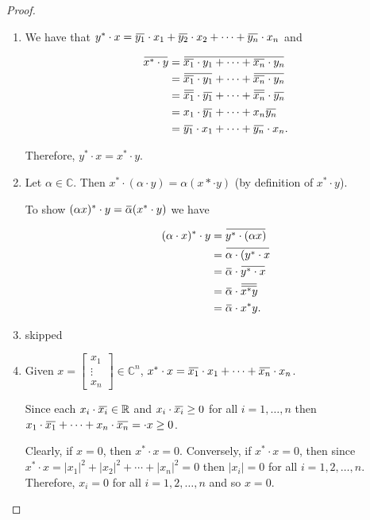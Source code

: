 \documentclass[12pt]{article}
\newcommand{\overbar}[1]{\mkern 1.5mu\overline{\mkern-1.5mu#1\mkern-1.5mu}\mkern 1.5mu}
\theoremstyle{definition}
\begin{document}
\begin{proof}
\begin{enumerate}[label = (\arabic*)]
\item We have that $y^* \cdot x = \overbar{y_1} \cdot x_1 + \overbar{y_2} \cdot x_2 +
\cdots + \overbar{y_n} \cdot x_n$ and 

\begin{align*}
\overbar{x^* \cdot y} &= \overbar{\overbar{x_1} \cdot y_1 + \cdots + \overbar{x_n} \cdot y_n} \\
&= \overbar{\overbar{x_1} \cdot y_1} + \cdots + \overbar{\overbar{x_n} \cdot y_n} \\
&= \overbar{\overbar{x_1}} \cdot \overbar{y_1} + \cdots + \overbar{\overbar{x_n}} \cdot \overbar{y_n} \\
&= x_1 \cdot \overbar{y_1} + \cdots + x_n \overbar{y_n} \\
&= \overbar{y_1} \cdot x_1 + \cdots + \overbar{y_n} \cdot x_n.
\end{align*}

Therefore, $y^* \cdot x = x^* \cdot y$.

\item Let $\alpha \in \mathbb{C}$. Then $x^* \cdot (\alpha \cdot y) = \alpha (x* \cdot y)$ (by
definition of $x^* \cdot y$).

To show $(\alpha x)^* \cdot y = \overbar{\alpha} (x^* \cdot y)$ we have

\begin{align*}
(\alpha \cdot x)^* \cdot y &= \overbar{y^* \cdot (\alpha x)} \\
&= \overbar{\alpha \cdot (y^* \cdot x} \\
&= \overbar{\alpha} \cdot \overbar{y^* \cdot x} \\
&= \overbar{\alpha} \cdot \overbar{\overbar{x^* y}} \\
&= \overbar{\alpha} \cdot x^* y.
\end{align*}

\item skipped

\item Given $x = \begin{bmatrix} x_1 \\ \vdots \\ x_n \end{bmatrix} \in \mathbb{C}^n$,
$x^* \cdot x = \overbar{x_1} \cdot x_1 + \cdots + \overbar{x_n} \cdot x_n$.

Since each $x_i \cdot \overbar{x_i} \in \mathbb{R}$ and $x_i \cdot \overbar{x_i} \geq 0$ for
all $i = 1, \ldots, n$ then $x_1 \cdot \overbar{x_1} + \cdots + x_n \cdot \overbar{x_n} =
\cdot x \geq 0$.

Clearly, if $x = 0$, then $x^* \cdot x = 0$. Conversely, if $x^* \cdot x = 0$, then
since $x^* \cdot x = |x_1|^2 + |x_2|^2 + \cdots + |x_n|^2 = 0$ then $|x_i| = 0$ for
all $i = 1, 2, \ldots, n$. Therefore, $x_i = 0$ for all $i = 1, 2, \ldots, n$ and so
$x = 0$.
\end{enumerate}
\end{proof}
\end{document}

